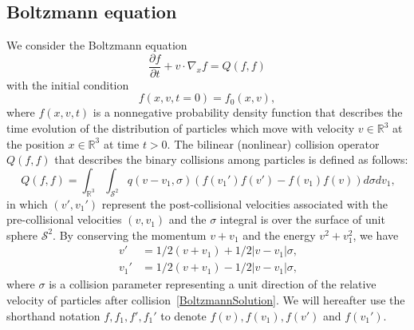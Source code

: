 \documentclass[times,final,nopreprintline]{elsarticle}
\newcommand{\bbR}{\mathbb R} \newcommand{\bbS}{\mathbb S}
\newcommand{\cS}{\mathcal S} \newcommand{\cT}{\mathcal T}
\begin{document}
\subsection{Boltzmann equation}
We consider the Boltzmann equation
\begin{equation*}
\frac{\partial f}{\partial t}   + v \cdot \nabla_x f =  Q(f,f)
\end{equation*}
with the initial condition 
\begin{equation*}
    f(x,v,t=0) = f_0(x,v),
\end{equation*}
where $f(x,v,t)$ is a nonnegative probability density function that describes the time evolution of the distribution of particles which move with velocity $v\in \bbR^3$ at the position $x \in \bbR^3$ at time $t>0$. The bilinear (nonlinear) collision operator $Q(f,f)$ that describes the binary collisions among particles is defined as follows:
\begin{equation}~\label{eq:nonlinearCollision}
    Q(f,f) = \int_{\bbR^3} \int_{\cS^2} q(v-v_1,\sigma) (f(v_1')f(v') - f(v_1) f(v)) d\sigma dv_1,
\end{equation}
in which $(v',v_1')$ represent the post-collisional velocities associated with the pre-collisional velocities $(v,v_1)$ and the $\sigma$ integral is over the surface of unit sphere $\cS^2$. By conserving the momentum $v+v_1$ and the energy $v^2 + v_1^2$, we have
\begin{subequations}~\label{BoltzmannSolution}
\begin{align}
v' &= 1/2 (v+v_1) + 1/2 |v-v_1| \sigma,  \\
v_1'&=1/2 (v+v_1) - 1/2  |v-v_1| \sigma,
\end{align}
\end{subequations}
where $\sigma$ is a collision parameter representing a unit direction of the relative velocity of particles after collision~\eqref{BoltzmannSolution}. We will hereafter use the shorthand notation $f, f_1, f', f_1'$ to denote $f(v), f(v_1), f(v')$ and $f(v_1')$.
\end{document}
